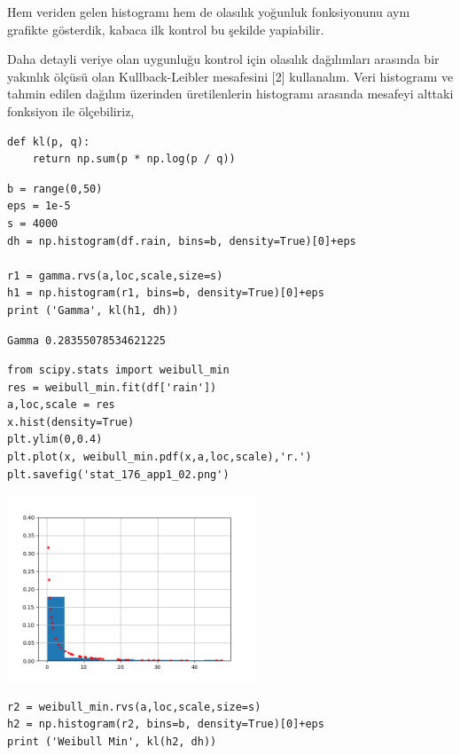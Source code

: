 \documentclass[12pt,fleqn]{article}\usepackage{../../common}
\begin{document}
Hem veriden gelen histogramı hem de olasılık yoğunluk fonksiyonunu aynı
grafikte gösterdik, kabaca ilk kontrol bu şekilde yapiabilir.

Daha detayli veriye olan uygunluğu kontrol için olasılık dağılımları arasında
bir yakınlık ölçüsü olan Kullback-Leibler mesafesini [2] kullanalım. Veri
histogramı ve tahmin edilen dağılım üzerinden üretilenlerin histogramı arasında
mesafeyi alttaki fonksiyon ile ölçebiliriz,

\begin{verbatim}
def kl(p, q):
    return np.sum(p * np.log(p / q))    
\end{verbatim}

\begin{verbatim}
b = range(0,50)
eps = 1e-5
s = 4000
dh = np.histogram(df.rain, bins=b, density=True)[0]+eps

r1 = gamma.rvs(a,loc,scale,size=s)
h1 = np.histogram(r1, bins=b, density=True)[0]+eps
print ('Gamma', kl(h1, dh))
\end{verbatim}

\begin{verbatim}
Gamma 0.28355078534621225
\end{verbatim}

\begin{verbatim}
from scipy.stats import weibull_min
res = weibull_min.fit(df['rain'])
a,loc,scale = res  
x.hist(density=True)
plt.ylim(0,0.4)
plt.plot(x, weibull_min.pdf(x,a,loc,scale),'r.')
plt.savefig('stat_176_app1_02.png')
\end{verbatim}

\includegraphics[width=20em]{stat_176_app1_02.png}

\begin{verbatim}
r2 = weibull_min.rvs(a,loc,scale,size=s)
h2 = np.histogram(r2, bins=b, density=True)[0]+eps
print ('Weibull Min', kl(h2, dh))
\end{verbatim}
\end{document}
